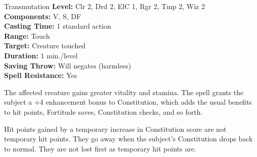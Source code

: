 {Transmutation}
{
	\textbf{Level:}
	Clr 2, Drd 2, ElC 1, Rgr 2, Tmp 2, Wiz 2\\
	\textbf{Components:}
	V, S, DF\\
	\textbf{Casting Time:}
	1 standard action\\
	\textbf{Range:}
	Touch\\
	\textbf{Target:}
	Creature touched\\
	\textbf{Duration:}
	1 min./level\\
	\textbf{Saving Throw:}
	Will negates (harmless)\\
	\textbf{Spell Resistance:}
	Yes\\
}
{
	The affected creature gains greater vitality and stamina. The spell grants the subject a +4 enhancement bonus to Constitution, which adds the usual benefits to hit points, Fortitude saves, Constitution checks, and so forth.

	Hit points gained by a temporary increase in Constitution score are not temporary hit points. They go away when the subject's Constitution drops back to normal. They are not lost first as temporary hit points are.

}
